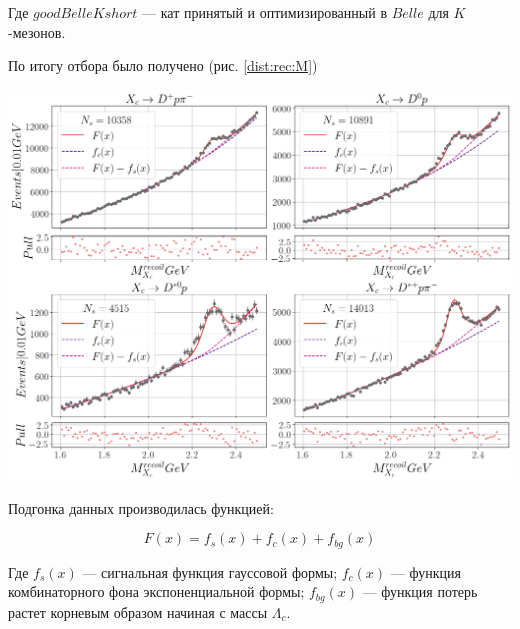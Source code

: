 \documentclass[a0,portrait]{a0poster}
\newcommand{\insqr}[1]{\left[ #1 \right]}
\newcommand\tab[1][0.51cm]{\hspace*{#1}}
\begin{document}
\begin{mdframed}[style=MyFrame]
\begin{multicols}{2}
Где $goodBelleKshort$ --- кат принятый и оптимизированный в $Belle$ для $K$-мезонов. 

\vspace{0.5cm}

\tab По итогу отбора было получено (рис. \ref{dist:rec:M})

\begin{minipage}{\columnwidth}
    \centering
    \includegraphics[width=0.9\columnwidth]{img/inc_res.png}
    \centering
    \captionsetup{justification=centering,margin=2cm}
    \label{dist:rec:M}
\end{minipage}

\vspace{0.5cm}


Подгонка данных производилась функцией:

\begin{equation*}
    F(x) = f_s(x) + f_c(x) + f_{bg}(x) 
\end{equation*}

Где $f_s(x)$ --- сигнальная функция гауссовой формы; $f_c(x)$ --- функция комбинаторного фона экспоненциальной формы; 
$f_{bg}(x)$ --- функция потерь растет корневым образом начиная с массы $\Lambda_c$.



\end{multicols}
\end{mdframed}
\end{document}
